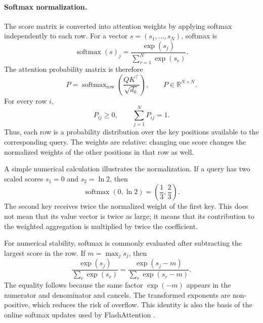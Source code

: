 \paragraph{Softmax normalization.}
The score matrix is converted into attention weights by applying softmax
independently to each row. For a vector
\(s=(s_1,\ldots,s_N)\), softmax is
\begin{equation}
    \operatorname{softmax}(s)_j
    =
    \frac{\exp(s_j)}
         {\displaystyle\sum_{r=1}^{N}\exp(s_r)}.
    \label{eq:attn-softmax-definition}
\end{equation}
The attention probability matrix is therefore
\begin{equation}
    P=
    \operatorname{softmax}_{\mathrm{row}}
    \left(
        \frac{QK^\top}{\sqrt{d_k}}
    \right),
    \qquad
    P\in\mathbb{R}^{N\times N}.
    \label{eq:attn-probability-matrix}
\end{equation}
For every row \(i\),
\begin{equation}
    P_{ij}\geq 0,
    \qquad
    \sum_{j=1}^{N}P_{ij}=1.
    \label{eq:attn-probability-properties}
\end{equation}
Thus, each row is a probability distribution over the key positions
available to the corresponding query. The weights are relative: changing
one score changes the normalized weights of the other positions in that row
as well.

A simple numerical calculation illustrates the normalization. If a query
has two scaled scores \(s_1=0\) and \(s_2=\ln 2\), then
\begin{equation}
    \operatorname{softmax}(0,\ln 2)
    =
    \left(
        \frac{1}{3},\frac{2}{3}
    \right).
    \label{eq:attn-softmax-example}
\end{equation}
The second key receives twice the normalized weight of the first key. This
does not mean that its value vector is twice as large; it means that its
contribution to the weighted aggregation is multiplied by twice the
coefficient.

For numerical stability, softmax is commonly evaluated after subtracting
the largest score in the row. If
\(m=\max_j s_j\), then
\begin{equation}
    \frac{\exp(s_j)}
         {\sum_r\exp(s_r)}
    =
    \frac{\exp(s_j-m)}
         {\sum_r\exp(s_r-m)}.
    \label{eq:attn-stable-softmax}
\end{equation}
The equality follows because the same factor \(\exp(-m)\) appears in the
numerator and denominator and cancels. The transformed exponents are
non-positive, which reduces the risk of overflow. This identity is also
the basis of the online softmax updates used by FlashAttention
\parencite{dao2023flashattention2}.

